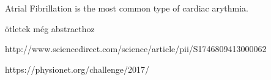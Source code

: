 Atrial Fibrillation is the most common type of cardiac arythmia.

ötletek még abstracthoz

http://www.sciencedirect.com/science/article/pii/S1746809413000062

https://physionet.org/challenge/2017/
